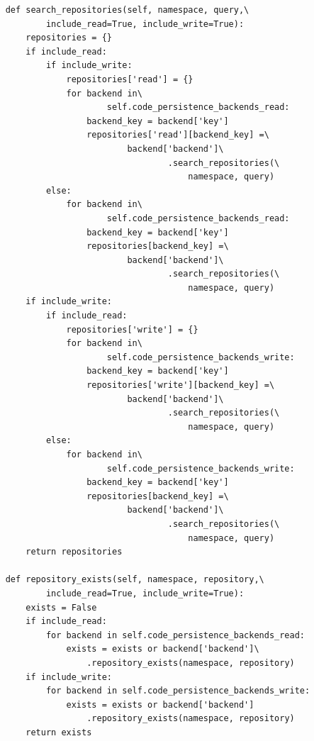 \begin{lstlisting}
    def search_repositories(self, namespace, query,\
            include_read=True, include_write=True):
        repositories = {}
        if include_read:
            if include_write:
                repositories['read'] = {}
                for backend in\
                        self.code_persistence_backends_read:
                    backend_key = backend['key']
                    repositories['read'][backend_key] =\
                            backend['backend']\
                                    .search_repositories(\
                                        namespace, query)
            else:
                for backend in\
                        self.code_persistence_backends_read:
                    backend_key = backend['key']
                    repositories[backend_key] =\
                            backend['backend']\
                                    .search_repositories(\
                                        namespace, query)
        if include_write:
            if include_read:
                repositories['write'] = {}
                for backend in\
                        self.code_persistence_backends_write:
                    backend_key = backend['key']
                    repositories['write'][backend_key] =\
                            backend['backend']\
                                    .search_repositories(\
                                        namespace, query)
            else:
                for backend in\
                        self.code_persistence_backends_write:
                    backend_key = backend['key']
                    repositories[backend_key] =\
                            backend['backend']\
                                    .search_repositories(\
                                        namespace, query)
        return repositories

    def repository_exists(self, namespace, repository,\
            include_read=True, include_write=True):
        exists = False
        if include_read:
            for backend in self.code_persistence_backends_read:
                exists = exists or backend['backend']\
                    .repository_exists(namespace, repository)
        if include_write:
            for backend in self.code_persistence_backends_write:
                exists = exists or backend['backend']
                    .repository_exists(namespace, repository)
        return exists


\end{lstlisting}
